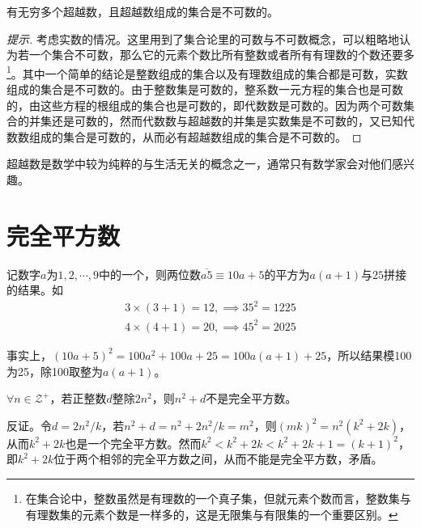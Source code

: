 \begin{theorem}
  有无穷多个超越数，且超越数组成的集合是不可数的。
\end{theorem}
\begin{proof}[提示]
  考虑实数的情况。这里用到了集合论里的可数与不可数概念，可以粗略地认为若一个集合不可数，那么它的元素个数比所有整数或者所有有理数的个数还要多\footnote{在集合论中，整数虽然是有理数的一个真子集，但就元素个数而言，整数集与有理数集的元素个数是一样多的，这是无限集与有限集的一个重要区别。}。其中一个简单的结论是整数组成的集合以及有理数组成的集合都是可数，实数组成的集合是不可数的。由于整数集是可数的，整系数一元方程的集合也是可数的，由这些方程的根组成的集合也是可数的，即代数数是可数的。因为两个可数集合的并集还是可数的，然而代数数与超越数的并集是实数集是不可数的，又已知代数数组成的集合是可数的，从而必有超越数组成的集合是不可数的。
\end{proof}

超越数是数学中较为纯粹的与生活无关的概念之一，通常只有数学家会对他们感兴趣。


\section{完全平方数}
\label{sec:perfect-squares}

\begin{example}[5结尾的两位数的平方]
  记数字$a$为$1,2,\cdots,9$中的一个，则两位数$\overline{a5}\equiv 10a + 5$的平方为$a(a+1)$与$25$拼接的结果。如
  \begin{align*}
    3\times(3+1) = 12, \implies 35^2 = 1225\\
    4\times(4+1) = 20, \implies 45^2 = 2025
  \end{align*}

  事实上，$(10a + 5)^2 = 100a^2 + 100a + 25 = 100a(a+1) + 25$，所以结果模100为25，除100取整为$a(a+1)$。
\end{example}

\begin{example}[1953 \kurschak]
  $\forall n\in\mathcal{Z}^+$，若正整数$d$整除$2n^2$，则$n^2+d$不是完全平方数。
\end{example}

\hints 反证。令$d=2n^2/k$，若$n^2+d=n^2+2n^2/k=m^2$，则$(mk)^2=n^2(k^2+2k)$，从而$k^2+2k$也是一个完全平方数。然而$k^2<k^2+2k<k^2+2k+1=(k+1)^2$，即$k^2+2k$位于两个相邻的完全平方数之间，从而不能是完全平方数，矛盾。

